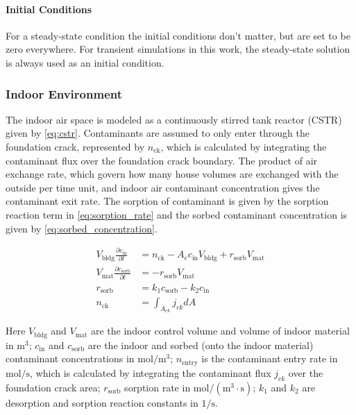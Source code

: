 \paragraph{Initial Conditions}

For a steady-state condition the initial conditions don't matter, but are set to be zero everywhere.
For transient simulations in this work, the steady-state solution is always used as an initial condition.

\subsubsection{Indoor Environment}\label{sec:indoor_environment}

The indoor air space is modeled as a continuously stirred tank reactor (CSTR) given by \eqref{eq:cstr}.
Contaminants are assumed to only enter through the foundation crack, represented by $n_\mathrm{ck}$, which is calculated by integrating the contaminant flux over the foundation crack boundary.
The product of air exchange rate, which govern how many house volumes are exchanged with the outside per time unit, and indoor air contaminant concentration gives the contaminant exit rate.
The sorption of contaminant is given by the sorption reaction term in \eqref{eq:sorption_rate} and the sorbed contaminant concentration is given by \eqref{eq:sorbed_concentration}.

\begin{align}
  V_\mathrm{bldg} \frac{\partial c_\mathrm{in}}{\partial t} &= n_\mathrm{ck} - A_e c_\mathrm{in} V_\mathrm{bldg} + r_\mathrm{sorb} V_\mathrm{mat}\label{eq:cstr} \\
  V_\mathrm{mat} \frac{\partial c_\mathrm{sorb}}{\partial t} &= -r_\mathrm{sorb} V_\mathrm{mat}\label{eq:sorbed_concentration} \\
  r_\mathrm{sorb} &= k_1 c_\mathrm{sorb} - k_2 c_\mathrm{in}\label{eq:sorption_rate}\\
  n_\mathrm{ck} &= \int_{A_{ck}} j_{ck} dA
\end{align}

Here $V_\mathrm{bldg}$ and $V_\mathrm{mat}$ are the indoor control volume and volume of indoor material in $\mathrm{m^3}$;
$c_\mathrm{in}$ and $c_\mathrm{sorb}$ are the indoor and sorbed (onto the indoor material) contaminant concentrations in $\mathrm{mol/m^3}$;
$n_\mathrm{entry}$ is the contaminant entry rate in $\mathrm{mol/s}$, which is calculated by integrating the contaminant flux $j_{ck}$ over the foundation crack area;
$r_\mathrm{sorb}$ sorption rate in $\mathrm{mol/(m^3 \cdot s)}$;
$k_1$ and $k_2$ are desorption and sorption reaction constants in $\mathrm{1/s}$.\par %

